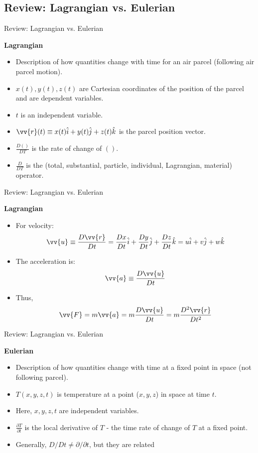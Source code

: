 \subsection{Review: Lagrangian vs. Eulerian}
\begin{frame}{Review: Lagrangian vs. Eulerian}

\textbf{Lagrangian}
\begin{itemize}
	\item Description of how quantities change with time for an air parcel (following air parcel motion).
	\item $x(t), y(t), z(t)$ are Cartesian coordinates of the position of the parcel and are dependent variables.
	\item $t$ is an independent variable.
	\item $\vv{r}(t) \equiv x(t)\hat i + y(t) \hat j + z(t) \hat k$ is the parcel position vector.
	\item $\frac{D()}{DT}$ is the rate of change of $()$.
	\item $\frac{D}{DT}$ is the (total, substantial, particle, individual, Lagrangian, material) operator.
\end{itemize}
\end{frame}
\begin{frame}{Review: Lagrangian vs. Eulerian}

\textbf{Lagrangian}
\begin{itemize}
	\item For velocity:
	$$\vv{u} \equiv \frac{D\vv{r}}{Dt} = \frac{Dx}{Dt}\hat i + \frac{Dy}{Dt}\hat j + \frac{Dz}{Dt}\hat k = u \hat i + v\hat j + w\hat k$$
	\item The acceleration is:
	$$\vv{a} \equiv \frac{D\vv{u}}{Dt}$$
	\item Thus, 
	$$\vv{F} = m\vv{a} = m\frac{D\vv{u}}{Dt} = m\frac{D^2 \vv{r}}{Dt^2}$$
\end{itemize}
\end{frame}
\begin{frame}{Review: Lagrangian vs. Eulerian}

\textbf{Eulerian}
\begin{itemize}
	\item Description of how quantities change with time at a fixed point in space (not following parcel).
	\item $T(x,y,z,t)$ is temperature at a point ($x,y,z$) in space at time $t$.
	\item Here, $x,y,z,t$ are independent variables.
	\item $\frac{\partial T}{\partial t}$ is the local derivative of $T$ - the time rate of change of $T$ at a fixed point.
	\item Generally, $D/Dt \neq \partial /\partial t$, but they are related
\end{itemize}
\end{frame}
